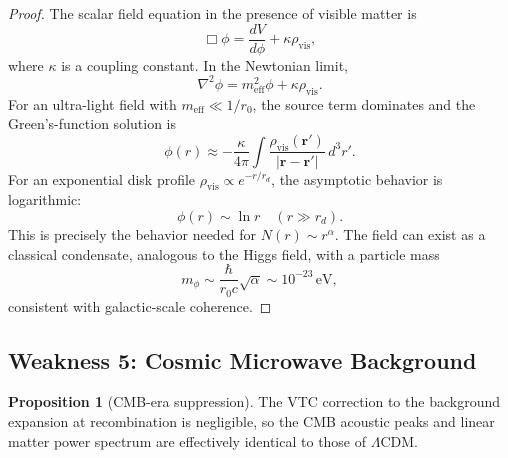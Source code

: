 \documentclass[11pt,a4paper]{article}
\theoremstyle{definition}
\newtheorem{proposition}[theorem]{Proposition}
\newcommand{\vis}{\mathrm{vis}}
\newcommand{\eff}{\mathrm{eff}}
\begin{document}
\begin{proof}
The scalar field equation in the presence of visible matter is
\begin{equation}
    \Box\phi = \frac{dV}{d\phi} + \kappa\rho_{\vis},
\end{equation}
where $\kappa$ is a coupling constant. In the Newtonian limit,
\begin{equation}
    \nabla^2\phi = m_{\eff}^2\phi + \kappa\rho_{\vis}.
\end{equation}
For an ultra-light field with $m_{\eff}\ll 1/r_0$, the source term dominates and the Green's-function solution is
\begin{equation}
    \phi(r) \approx -\frac{\kappa}{4\pi}\int \frac{\rho_{\vis}(\mathbf{r}')}{|\mathbf{r}-\mathbf{r}'|}\,d^3r'.
\end{equation}
For an exponential disk profile $\rho_{\vis}\propto e^{-r/r_d}$, the asymptotic behavior is logarithmic:
\begin{equation}
    \phi(r) \sim \ln r\quad (r\gg r_d).
\end{equation}
This is precisely the behavior needed for $N(r)\sim r^\alpha$. The field can exist as a classical condensate, analogous to the Higgs field, with a particle mass
\begin{equation}
    m_\phi \sim \frac{\hbar}{r_0 c}\sqrt{\alpha} \sim 10^{-23}\,\mathrm{eV},
\end{equation}
consistent with galactic-scale coherence.
\end{proof}

\subsection{Weakness 5: Cosmic Microwave Background}

\begin{proposition}[CMB-era suppression]
The VTC correction to the background expansion at recombination is negligible, so the CMB acoustic peaks and linear matter power spectrum are effectively identical to those of $\Lambda$CDM.
\end{proposition}
\end{document}
